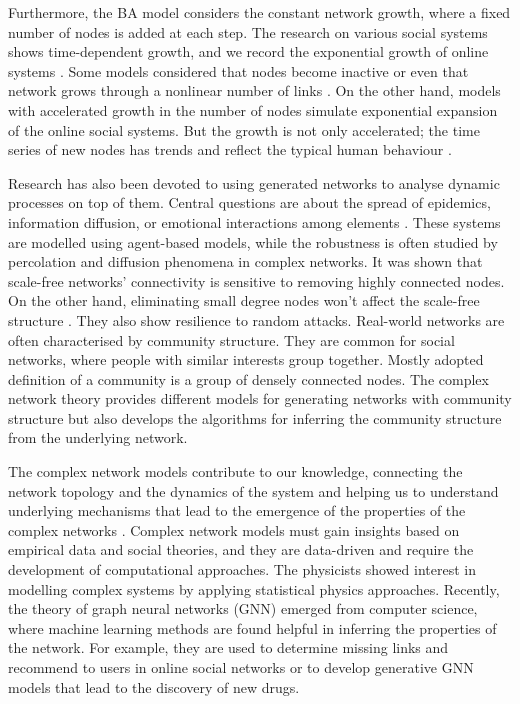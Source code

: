 Furthermore, the BA model considers the constant network growth, where a fixed number of nodes is added at each step. The research on various social systems shows time-dependent growth, and we record the exponential growth of online systems \cite{liu2019}. Some models considered that nodes become inactive or even that network grows through a nonlinear number of links \cite{pham2016}. On the other hand, models with accelerated growth in the number of nodes \cite{sen2004} simulate exponential expansion of the online social systems. But the growth is not only accelerated; the time series of new nodes has trends and reflect the typical human behaviour \cite{mitrovic2010a, mitrovic2012,mitrovic2015}.

Research has also been devoted to using generated networks to analyse dynamic processes on top of them. Central questions are about the spread of epidemics, information diffusion, or emotional interactions among elements \cite{garas2012emotional}. These systems are modelled using agent-based models, while the robustness is often studied by percolation and diffusion phenomena in complex networks. It was shown that scale-free networks' connectivity is sensitive to removing highly connected nodes. On the other hand, eliminating small degree nodes won't affect the scale-free structure \cite{cohen2000resilience}. They also show resilience to random attacks. Real-world networks are often characterised by community structure. They are common for social networks, where people with similar interests group together. Mostly adopted definition of a community is a group of densely connected nodes. The complex network theory provides different models for generating networks with community structure but also develops the algorithms for inferring the community structure from the underlying network. 

The complex network models contribute to our knowledge, connecting the network topology and the dynamics of the system and helping us to understand underlying mechanisms that lead to the emergence of the properties of the complex networks \cite{barabasi1999, tadic2001, mitrovic2009, ghoshal2013uncovering}. %
Complex network models must gain insights based on empirical data and social theories, and they are data-driven and require the development of computational approaches. The physicists showed interest in modelling complex systems by applying statistical physics approaches. Recently, the theory of graph neural networks (GNN) emerged from computer science, where machine learning methods are found helpful in inferring the properties of the network. For example, they are used to determine missing links and recommend to users in online social networks or to develop generative GNN models that lead to the discovery of new drugs.  

